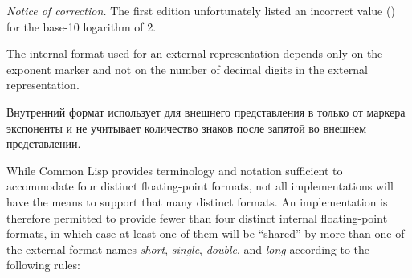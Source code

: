 \begin{new}%
\emph{Notice of correction.}
The first edition unfortunately listed an incorrect value ()
for the base-10 logarithm of 2.
\end{new}

The internal format used for an external representation depends only
on the exponent marker and not on the number of decimal digits
in the external representation.

Внутренний формат использует для внешнего представления в только от
маркера экспоненты и не учитывает количество знаков после запятой во внешнем
представлении. 

While Common Lisp provides terminology and notation sufficient
to accommodate four distinct floating-point formats,
not all implementations will have the means to support
that many distinct formats.
An implementation is therefore permitted to provide
fewer than four distinct internal floating-point formats,
in which case at least one of them will be ``shared''
by more than one of the external format names \emph{short}, \emph{single},
\emph{double}, and \emph{long} according to the following rules:

